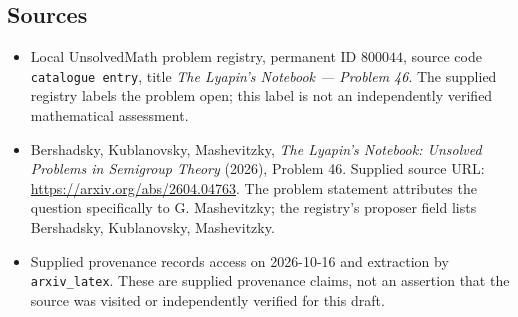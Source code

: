 \documentclass[11pt]{article}
\begin{document}
\subsection{Sources}
\begin{itemize}
\item Local UnsolvedMath problem registry, permanent ID \(800044\), source code \texttt{catalogue entry}, title \emph{The Lyapin's Notebook --- Problem 46}. The supplied registry labels the problem open; this label is not an independently verified mathematical assessment.
\item Bershadsky, Kublanovsky, Mashevitzky, \emph{The Lyapin's Notebook: Unsolved Problems in Semigroup Theory} (2026), Problem 46. Supplied source URL: \url{https://arxiv.org/abs/2604.04763}. The problem statement attributes the question specifically to G. Mashevitzky; the registry's proposer field lists Bershadsky, Kublanovsky, Mashevitzky.
\item Supplied provenance records access on 2026-10-16 and extraction by \texttt{arxiv\_latex}. These are supplied provenance claims, not an assertion that the source was visited or independently verified for this draft.
\end{itemize}
\end{document}

